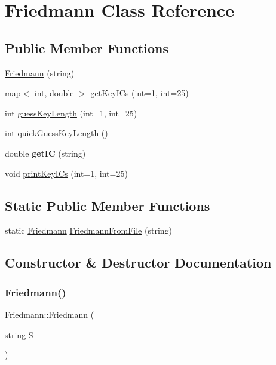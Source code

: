 \hypertarget{classFriedmann}{}\section{Friedmann Class Reference}
\label{classFriedmann}
\subsection*{Public Member Functions}
\begin{DoxyCompactItemize}
\item 
\hyperlink{classFriedmann_af564cf33edad401565a3ac01cab6b117}{Friedmann} (string)
\item 
map$<$ int, double $>$ \hyperlink{classFriedmann_ad8b6d559d8beb795a45d95601039dc05}{get\+Key\+I\+Cs} (int=1, int=25)
\item 
int \hyperlink{classFriedmann_a4b63925a80957b0263c78cfcd91fb362}{guess\+Key\+Length} (int=1, int=25)
\item 
int \hyperlink{classFriedmann_a638777d8e78a6101c69e61208086d1bf}{quick\+Guess\+Key\+Length} ()
\item 
\mbox{\label{classFriedmann_a80ff9c00de8d6efd9e00ce3f830cfb61}} 
double {\bfseries get\+IC} (string)
\item 
void \hyperlink{classFriedmann_ad03460df53d45df8c937703ce02af949}{print\+Key\+I\+Cs} (int=1, int=25)
\end{DoxyCompactItemize}
\subsection*{Static Public Member Functions}
\begin{DoxyCompactItemize}
\item 
static \hyperlink{classFriedmann}{Friedmann} \hyperlink{classFriedmann_ad096c7c2b3e83b56a55cd119f220c73d}{Friedmann\+From\+File} (string)
\end{DoxyCompactItemize}


\subsection{Constructor \& Destructor Documentation}
\mbox{\label{classFriedmann_af564cf33edad401565a3ac01cab6b117}} 
\subsubsection{\texorpdfstring{Friedmann()}{Friedmann()}}
{\footnotesize\ttfamily Friedmann\+::\+Friedmann (\begin{DoxyParamCaption}\item[{string}]{S }\end{DoxyParamCaption})}


